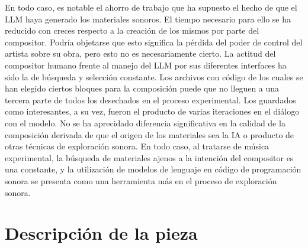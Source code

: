 En todo caso, es notable el ahorro de trabajo que ha supuesto el hecho de que el LLM haya generado los materiales sonoros. El tiempo necesario para ello se ha reducido con creces respecto a la creación de los mismos por parte del compositor. Podría objetarse que esto significa la pérdida del poder de control del artista sobre su obra, pero esto no es necesariamente cierto. La actitud del compositor humano frente al manejo del LLM por sus diferentes interfaces ha sido la de búsqueda y selección constante. Los archivos con código de los cuales se han elegido ciertos bloques para la composición puede que no lleguen a una tercera parte de todos los desechados en el proceso experimental. Los guardados como interesantes, a su vez, fueron el producto de varias iteraciones en el diálogo con el modelo. No se ha aprecidado diferencia significativa en la calidad de la composición derivada de que el origen de los materiales sea la IA o producto de otras técnicas de exploración sonora. En todo caso, al tratarse de música experimental, la búsqueda de materiales ajenos a la intención del compositor es una constante, y la utilización de modelos de lenguaje en código de programación sonora se presenta como una herramienta más en el proceso de exploración sonora.

\section{Descripción de la pieza}

